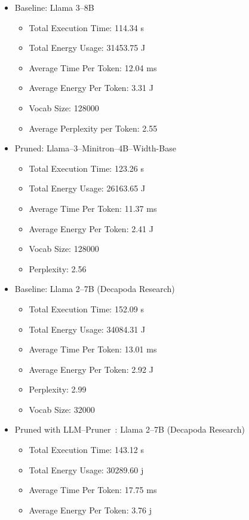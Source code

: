 \documentclass{article}
\begin{document}
    \begin{itemize}
        \item Baseline: Llama 3--8B
        \begin{itemize}
            \item Total Execution Time: 114.34 s
            \item Total Energy Usage: 31453.75 J
            \item Average Time Per Token: 12.04 ms
            \item Average Energy Per Token: 3.31 J
            \item Vocab Size: 128000
            \item Average Perplexity per Token: 2.55
        \end{itemize}
        \item Pruned: Llama--3--Minitron--4B--Width-Base
        \begin{itemize}
            \item Total Execution Time: 123.26 s
            \item Total Energy Usage: 26163.65 J
            \item Average Time Per Token: 11.37 ms
            \item Average Energy Per Token: 2.41 J
            \item Vocab Size: 128000
            \item Perplexity: 2.56
        \end{itemize}
        \item Baseline: Llama 2--7B (Decapoda Research)~\cite{decapoda-llama-7B}
        \begin{itemize}
            \item Total Execution Time: 152.09 s
            \item Total Energy Usage: 34084.31 J
            \item Average Time Per Token: 13.01 ms
            \item Average Energy Per Token: 2.92 J
            \item Perplexity: 2.99
            \item Vocab Size: 32000
        \end{itemize}
        \item Pruned with LLM--Pruner~\cite{ma2023llm}: Llama 2--7B (Decapoda Research)
        \begin{itemize}
            \item Total Execution Time: 143.12 s
            \item Total Energy Usage: 30289.60 j
            \item Average Time Per Token: 17.75 ms
            \item Average Energy Per Token: 3.76 j
        \end{itemize}
    \end{itemize}
\end{document}
